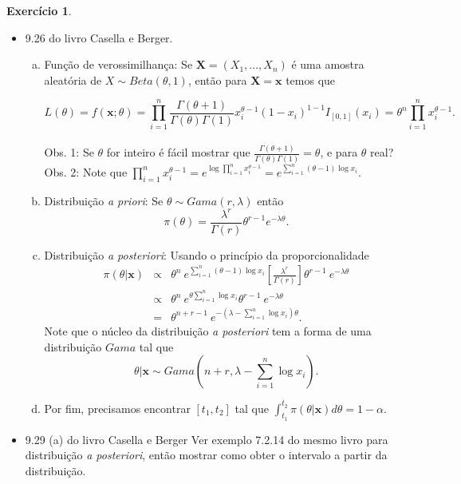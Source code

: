 \documentclass[letter,11pt]{article}
\newtheorem{exer}{Exercício}
\begin{document}
\begin{exer} \rm
\end{exer}

\begin{itemize}
  \item 9.26 do livro Casella e Berger.
  \begin{enumerate}[a)]
    \item Função de verossimilhança: Se $\boldsymbol{X} = (X_1, \ldots, X_n)$ é 
    uma amostra aleatória de $X \sim Beta(\theta, 1)$, então para $\boldsymbol{X} 
    = \boldsymbol{x}$ temos que 
    
    $$ L(\theta) = f(\boldsymbol{x}; \theta) = \prod_{i=1}^n \frac{\Gamma(\theta + 1)}
    {\Gamma(\theta) \Gamma(1)} x_i^{\theta-1} (1-x_i)^{1-1}I_{[0,1]}(x_i) = 
    \theta^n \prod_{i=1}^n x_i^{\theta-1}.$$ \\
    
    Obs. 1: Se $\theta$ for inteiro é fácil mostrar que $\frac{\Gamma(\theta + 1)}
    {\Gamma(\theta) \Gamma(1)} = \theta$, e para $\theta$ real? \\
    
    Obs. 2: Note que $\prod_{i=1}^n x_i^{\theta-1} = e^{ \log \prod_{i=1}^n 
    x_i^{\theta-1} } = e^{ \sum_{i=1}^n (\theta-1) \log x_i }.$

    \item Distribuição \textit{a priori}: Se $\theta \sim Gama(r, \lambda)$ então
    $$ \pi(\theta) = \frac{\lambda^r}{\Gamma(r)} \theta^{r-1} e^{-\lambda \theta}.$$
    
    \item Distribuição \textit{a posteriori}: Usando o princípio da proporcionalidade 
    \begin{eqnarray}
    \pi(\theta \vert \boldsymbol{x}) 
        & \propto & \theta^n \: e^{ \sum_{i=1}^n (\theta-1) \log x_i } \left[ 
          \frac{\lambda^r}{\Gamma(r)} \right] \theta^{r-1} \: e^{-\lambda \theta} \nonumber \\
        & \propto & \theta^{n} \: e^{ \theta \sum_{i=1}^n \log x_i } \theta^{r-1} \:
          e^{-\lambda \theta} \nonumber \\
        & = & \theta^{n+r-1} \: e^{-(\lambda - \sum_{i=1}^n \log x_i) \theta}. \nonumber
    \end{eqnarray}
    Note que o núcleo da distribuição \textit{a posteriori} tem a forma de uma distribuição 
    $Gama$ tal que 
    $$ \theta \vert \boldsymbol{x} \sim Gama(n+r, \lambda - \sum_{i=1}^n \log x_i).$$
    
    \item Por fim, precisamos encontrar $[t_1, t_2]$ tal que $\int_{t_1}^{t_2} \pi(\theta \vert \boldsymbol{x}) d\theta = 1-\alpha$.
    
    
  \end{enumerate}
  
  \item 9.29 (a) do livro Casella e Berger
  Ver exemplo 7.2.14 do mesmo livro para distribuição \textit{a posteriori}, então mostrar como obter o intervalo a partir da distribuição.
\end{itemize}
\end{document}
